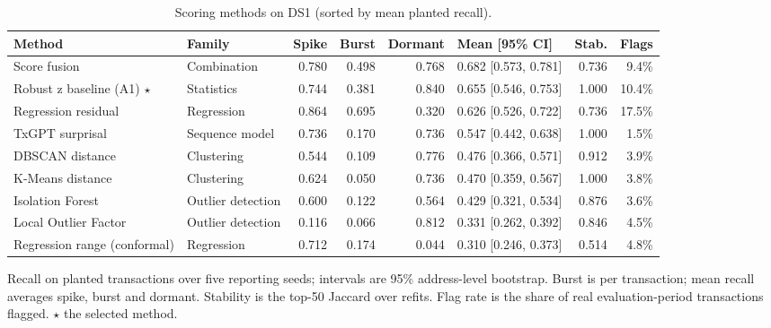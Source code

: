 \begin{table}[htbp]
\centering
\footnotesize
\caption{Scoring methods on DS1 (sorted by mean planted recall).}
\label{tab:ds1}
\begin{tabularx}{\textwidth}{@{}L{3.6cm} l r r r l r R@{}}
\toprule
Method & Family & Spike & Burst & Dormant & Mean [95\% CI] & Stab. & Flags \\
\midrule
Score fusion & Combination & 0.780 & 0.498 & 0.768 & 0.682 [0.573, 0.781] & 0.736 & 9.4\% \\
Robust z baseline (A1) $\star$ & Statistics & 0.744 & 0.381 & 0.840 & 0.655 [0.546, 0.753] & 1.000 & 10.4\% \\
Regression residual & Regression & 0.864 & 0.695 & 0.320 & 0.626 [0.526, 0.722] & 0.736 & 17.5\% \\
TxGPT surprisal & Sequence model & 0.736 & 0.170 & 0.736 & 0.547 [0.442, 0.638] & 1.000 & 1.5\% \\
DBSCAN distance & Clustering & 0.544 & 0.109 & 0.776 & 0.476 [0.366, 0.571] & 0.912 & 3.9\% \\
K-Means distance & Clustering & 0.624 & 0.050 & 0.736 & 0.470 [0.359, 0.567] & 1.000 & 3.8\% \\
Isolation Forest & Outlier detection & 0.600 & 0.122 & 0.564 & 0.429 [0.321, 0.534] & 0.876 & 3.6\% \\
Local Outlier Factor & Outlier detection & 0.116 & 0.066 & 0.812 & 0.331 [0.262, 0.392] & 0.846 & 4.5\% \\
Regression range (conformal) & Regression & 0.712 & 0.174 & 0.044 & 0.310 [0.246, 0.373] & 0.514 & 4.8\% \\
\bottomrule
\end{tabularx}
\par\smallskip\parbox{\textwidth}{\footnotesize Recall on planted transactions over five reporting seeds; intervals are 95\% address-level bootstrap. Burst is per transaction; mean recall averages spike, burst and dormant. Stability is the top-50 Jaccard over refits. Flag rate is the share of real evaluation-period transactions flagged. $\star$ the selected method.}
\end{table}
